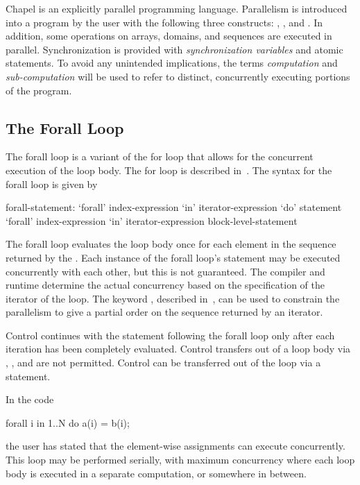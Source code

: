 \label{Parallelism_and_Synchronization}

Chapel is an explicitly parallel programming language.  Parallelism is
introduced into a program by the user with the following three
constructs: , , and .  In
addition, some operations on arrays, domains, and sequences are
executed in parallel.  Synchronization is provided
with \emph{synchronization variables} and atomic statements.  To avoid
any unintended implications, the terms \emph{computation}
and \emph{sub-computation} will be used to refer to distinct,
concurrently executing portions of the program.

\subsection{The Forall Loop}
\label{Forall}

The forall loop is a variant of the for loop that allows for the
concurrent execution of the loop body. The for loop is described
in~. The syntax for the forall loop is given by
\begin{syntax}
forall-statement:
   `forall' index-expression `in' iterator-expression `do' statement
   `forall' index-expression `in' iterator-expression block-level-statement
\end{syntax}

The forall loop evaluates the loop body once for each element in the
sequence returned by the .  Each instance of
the forall loop's statement may be executed concurrently with each
other, but this is not guaranteed.  The compiler and runtime determine
the actual concurrency based on the specification of the iterator of
the loop.  The keyword , described
in~, can be used to constrain the parallelism to
give a partial order on the sequence returned by an iterator.

Control continues with the statement following the forall loop only
after each iteration has been completely evaluated.  Control transfers
out of a loop body via , ,
and  are not permitted.  Control can be transferred out
of the loop via a  statement.

\begin{example}
In the code
\begin{chapel}
forall i in 1..N do
  a(i) = b(i);
\end{chapel}
the user has stated that the element-wise assignments can execute
concurrently.  This loop may be performed serially, with maximum
concurrency where each loop body is executed in a separate
computation, or somewhere in between.
\end{example}

